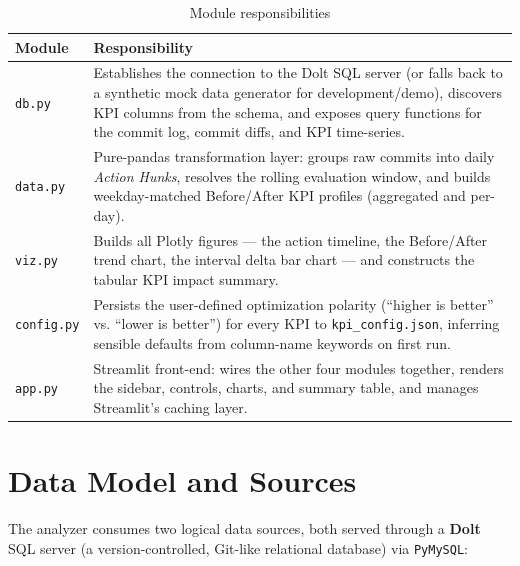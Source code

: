 \begin{table}[htbp]
    \centering
    \caption{Module responsibilities}
    \label{tab:modules}
    \begin{tabular}{@{}p{2.4cm}p{9.5cm}@{}}
        \toprule
        \textbf{Module} & \textbf{Responsibility} \\
        \midrule
        \texttt{db.py}     & Establishes the connection to the Dolt SQL
                              server (or falls back to a synthetic mock
                              data generator for development/demo),
                              discovers KPI columns from the schema, and
                              exposes query functions for the commit log,
                              commit diffs, and KPI time-series. \\
        \texttt{data.py}   & Pure-pandas transformation layer: groups raw
                              commits into daily \emph{Action Hunks},
                              resolves the rolling evaluation window,
                              and builds weekday-matched Before/After
                              KPI profiles (aggregated and per-day). \\
        \texttt{viz.py}    & Builds all Plotly figures --- the action
                              timeline, the Before/After trend chart, the
                              interval delta bar chart --- and constructs
                              the tabular KPI impact summary. \\
        \texttt{config.py} & Persists the user-defined optimization
                              polarity (``higher is better'' vs. ``lower
                              is better'') for every KPI to
                              \texttt{kpi\_config.json}, inferring
                              sensible defaults from column-name
                              keywords on first run. \\
        \texttt{app.py}    & Streamlit front-end: wires the other four
                              modules together, renders the sidebar,
                              controls, charts, and summary table, and
                              manages Streamlit's caching layer. \\
        \bottomrule
    \end{tabular}
\end{table}

\section{Data Model and Sources}
The analyzer consumes two logical data sources, both served through a
\textbf{Dolt} SQL server (a version-controlled, Git-like relational
database) via \texttt{PyMySQL}:

